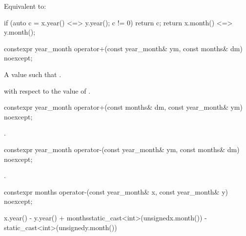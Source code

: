 \begin{itemdescr}
\pnum
\effects
Equivalent to:
\begin{codeblock}
if (auto c = x.year() <=> y.year(); c != 0) return c;
return x.month() <=> y.month();
\end{codeblock}
\end{itemdescr}

%
\begin{itemdecl}
constexpr year_month operator+(const year_month& ym, const months& dm) noexcept;
\end{itemdecl}

\begin{itemdescr}
\pnum
\returns
A  value  such that .

\pnum
\complexity
{} with respect to the value of .
\end{itemdescr}

%
\begin{itemdecl}
constexpr year_month operator+(const months& dm, const year_month& ym) noexcept;
\end{itemdecl}

\begin{itemdescr}
\pnum
\returns
{}.
\end{itemdescr}

%
\begin{itemdecl}
constexpr year_month operator-(const year_month& ym, const months& dm) noexcept;
\end{itemdecl}

\begin{itemdescr}
\pnum
\returns
{}.
\end{itemdescr}

%
\begin{itemdecl}
constexpr months operator-(const year_month& x, const year_month& y) noexcept;
\end{itemdecl}

\begin{itemdescr}
\pnum
\returns
\begin{codeblock}
x.year() - y.year() + months{static_cast<int>(unsigned{x.month()}) -
                             static_cast<int>(unsigned{y.month()})}
\end{codeblock}
\end{itemdescr}


